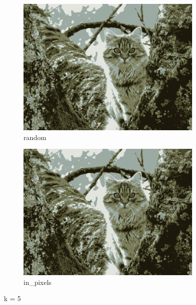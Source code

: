 \documentclass{article}
\begin{document}
\begin{figure}[h!]
  \begin{subfigure}{.5\textwidth}
    \centering
    \includegraphics[width=.8\linewidth]{image/random_5.png}
    \caption{random}
    \label{fig:sfig3}
  \end{subfigure}%
  \begin{subfigure}{.5\textwidth}
    \centering
    \includegraphics[width=.8\linewidth]{image/in_5.png}
    \caption{in\_pixels}
    \label{fig:sfig4}
  \end{subfigure}
  \caption{k = 5}
  \label{fig:fig1}
\end{figure}
\end{document}

